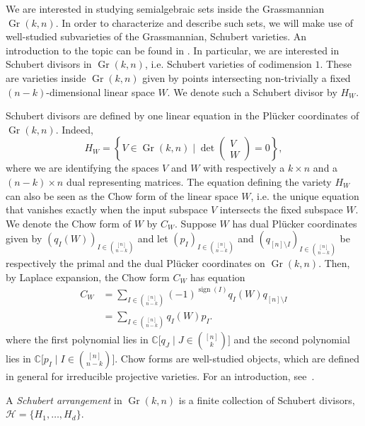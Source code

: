 \documentclass[english]{ourlematema}
\DeclareMathOperator{\Gr}{Gr}
\DeclareMathOperator{\sign}{sign}
\newcommand{\CC}{\mathbb{C}}
\begin{document}
We are interested in studying semialgebraic sets inside the Grassmannian $\Gr(k,n)$. In order to characterize and describe such sets, we will make use of well-studied subvarieties of the Grassmannian, Schubert varieties. An introduction to the topic can be found in \cite{fulton}. 
In particular, we are interested in Schubert divisors in $\Gr(k,n)$, i.e. Schubert varieties of codimension $1$. These are varieties inside $\Gr(k,n)$ given by points intersecting non-trivially a fixed $(n-k)$-dimensional linear space $W$. We denote such a Schubert divisor by $H_W$.

Schubert divisors are defined by one linear equation in the Pl\"ucker coordinates of $\Gr(k,n)$. Indeed, 
\[H_W = \left\{ V\in \Gr(k,n) \mid \det\begin{pmatrix} V\\ W \end{pmatrix}=0 \right\},\]
where we are identifying the spaces $V$ and $W$ with respectively a $k\times n$ and a $(n-k)\times n$ dual representing matrices.
The equation defining the variety $H_W$ can also be seen as the Chow form of the linear space $W$, i.e. the unique equation that vanishes exactly when the input subspace $V$ intersects the fixed subspace $W$. We denote the Chow form of $W$ by $C_W$. 
Suppose $W$ has dual Pl\"ucker coordinates given by $(q_I(W))_{I\in \binom{[n]}{n-k}}$ and let $(p_I)_{I\in \binom{[n]}{n-k}}$ and $(q_{[n]\setminus I})_{I\in \binom{[n]}{n-k}}$ be respectively the primal and the dual Pl\"ucker coordinates on $\Gr(k,n)$. Then, by Laplace expansion, the Chow form $C_W$ has equation
\begin{equation}\label{eq : Chow equation}
    \begin{split}
    C_W &= \sum_{I \in \binom{[n]}{n-k}} (-1)^{\sign(I)} q_I(W) q_{[n]\setminus I} \\
    &= \sum_{I\in \binom{[n]}{n-k}} q_I(W) p_I.
    \end{split}
\end{equation}
where the first polynomial lies in $\CC\bigl[q_J \mid J \in \binom{[n]}{k}\bigr]$ and the second polynomial lies in $\CC\bigl[p_I \mid I \in \binom{[n]}{n-k} \bigr]$. Chow forms are well-studied objects, which 
are defined in general for irreducible projective varieties. For an introduction, see~\cite{chow}.

\begin{dfn}
    A \emph{Schubert arrangement} in $\Gr(k,n)$ is a finite collection of Schubert divisors, $\mathcal{H} = \{H_1,\ldots, H_d\}$.
\end{dfn}
\end{document}
